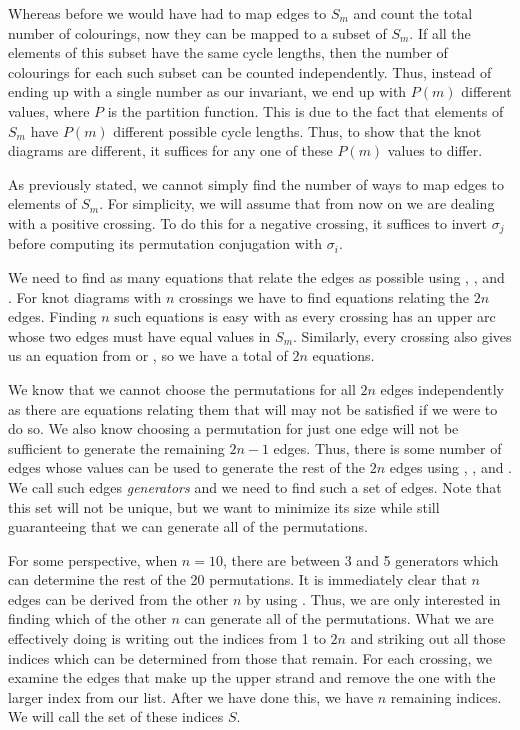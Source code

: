 \begin{paper}
Whereas before we would have had to map edges to $S_m$ and count the total
number of colourings, now they can be mapped to a subset of $S_m$.
If all the elements of this subset have the same cycle lengths, then the number
of colourings for each such subset can be counted independently.
Thus, instead of ending up with a single number as our invariant, we end up with
$P(m)$ different values, where $P$ is the partition function.
This is due to the fact that elements of $S_m$ have $P(m)$ different possible
cycle lengths.
Thus, to show that the knot diagrams are different, it suffices for any one of
these $P(m)$ values to differ.

As previously stated, we cannot simply find the number of ways to map edges to
elements of $S_m$.
For simplicity, we will assume that from now on we are dealing with a positive
crossing.
To do this for a negative crossing, it suffices to invert $\sigma_j$ before
computing its permutation conjugation with $\sigma_i$.

We need to find as many equations that relate the edges as possible using
\eqUpper, \eqPositive, and \eqNegative.
For knot diagrams with $n$ crossings we have to find equations relating the $2n$
edges.
Finding $n$ such equations is easy with \eqUpper as every crossing has an upper
arc whose two edges must have equal values in $S_m$.
Similarly, every crossing also gives us an equation from \eqRight or \eqLeft, so
we have a total of $2n$ equations.

We know that we cannot choose the permutations for all $2n$ edges independently
as there are equations relating them that will may not be satisfied if we were
to do so.
We also know choosing a permutation for just one edge will not be sufficient to
generate the remaining $2n-1$ edges.
Thus, there is some number of edges whose values can be used to generate the
rest of the $2n$ edges using \eqUpper, \eqRight, and \eqLeft.
We call such edges \textit{generators} and we need to find such a set of
edges.
Note that this set will not be unique, but we want to minimize its size while
still guaranteeing that we can generate all of the permutations.

For some perspective, when $n=10$, there are between 3 and 5 generators which
can determine the rest of the 20 permutations.
It is immediately clear that $n$ edges can be derived from the other $n$ by
using \eqUpper.
Thus, we are only interested in finding which of the other $n$ can generate all
of the permutations.
What we are effectively doing is writing out the indices from 1 to $2n$ and
striking out all those indices which can be determined from those that remain.
For each crossing, we examine the edges that make up the upper strand and remove
the one with the larger index from our list.
After we have done this, we have $n$ remaining indices.
We will call the set of these indices $S$.


\end{paper}
